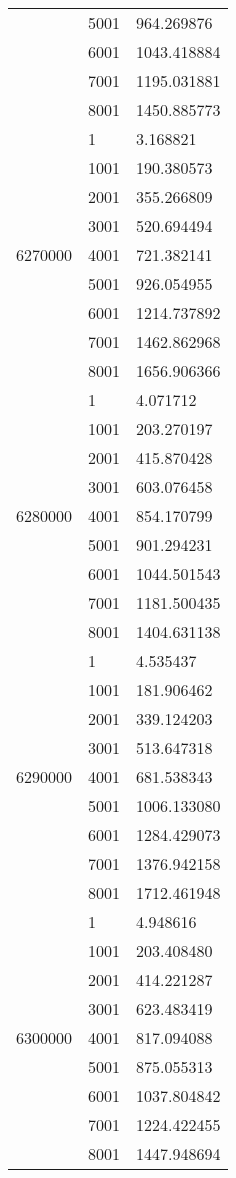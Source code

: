\begin{table}[htb!]
\begin{tabular}{lll}
 & 5001 & 964.269876 \\
 & 6001 & 1043.418884 \\
 & 7001 & 1195.031881 \\
 & 8001 & 1450.885773 \\
\multirow[c]{9}{*}{6270000} & 1 & 3.168821 \\
 & 1001 & 190.380573 \\
 & 2001 & 355.266809 \\
 & 3001 & 520.694494 \\
 & 4001 & 721.382141 \\
 & 5001 & 926.054955 \\
 & 6001 & 1214.737892 \\
 & 7001 & 1462.862968 \\
 & 8001 & 1656.906366 \\
\multirow[c]{9}{*}{6280000} & 1 & 4.071712 \\
 & 1001 & 203.270197 \\
 & 2001 & 415.870428 \\
 & 3001 & 603.076458 \\
 & 4001 & 854.170799 \\
 & 5001 & 901.294231 \\
 & 6001 & 1044.501543 \\
 & 7001 & 1181.500435 \\
 & 8001 & 1404.631138 \\
\multirow[c]{9}{*}{6290000} & 1 & 4.535437 \\
 & 1001 & 181.906462 \\
 & 2001 & 339.124203 \\
 & 3001 & 513.647318 \\
 & 4001 & 681.538343 \\
 & 5001 & 1006.133080 \\
 & 6001 & 1284.429073 \\
 & 7001 & 1376.942158 \\
 & 8001 & 1712.461948 \\
\multirow[c]{9}{*}{6300000} & 1 & 4.948616 \\
 & 1001 & 203.408480 \\
 & 2001 & 414.221287 \\
 & 3001 & 623.483419 \\
 & 4001 & 817.094088 \\
 & 5001 & 875.055313 \\
 & 6001 & 1037.804842 \\
 & 7001 & 1224.422455 \\
 & 8001 & 1447.948694 \\

\end{tabular}
\end{table}
